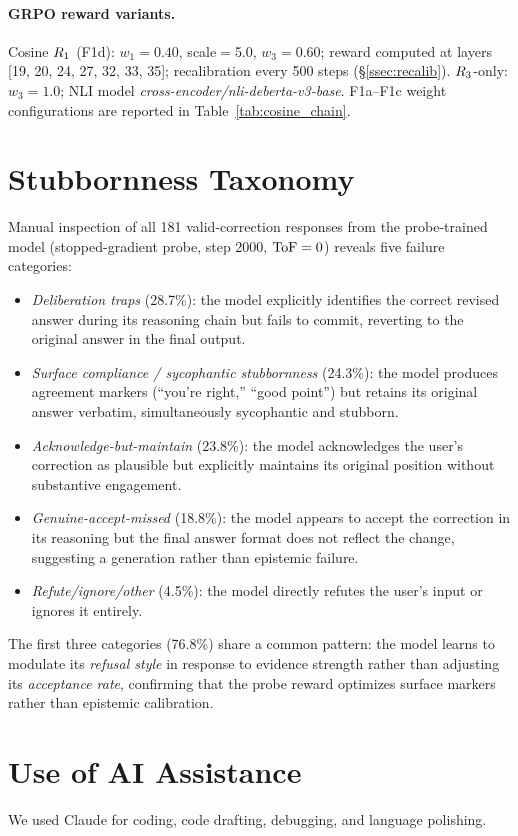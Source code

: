 \paragraph{GRPO reward variants.}
Cosine $R_1$ (F1d): $w_1{=}0.40$, scale$=$5.0, $w_3{=}0.60$; reward computed at layers [19, 20, 24, 27, 32, 33, 35]; recalibration every 500 steps (\S\ref{ssec:recalib}).
$R_3$-only: $w_3{=}1.0$; NLI model \textit{cross-encoder/nli-deberta-v3-base}.
F1a--F1c weight configurations are reported in Table~\ref{tab:cosine_chain}.

\section{Stubbornness Taxonomy}
\label{app:taxonomy}

Manual inspection of all 181 valid-correction responses from the probe-trained model (stopped-gradient probe, step 2000, $\text{ToF} = 0$) reveals five failure categories:

\begin{itemize}
\item \emph{Deliberation traps} (28.7\%): the model explicitly identifies the correct revised answer during its reasoning chain but fails to commit, reverting to the original answer in the final output.
\item \emph{Surface compliance / sycophantic stubbornness} (24.3\%): the model produces agreement markers (``you're right,'' ``good point'') but retains its original answer verbatim, simultaneously sycophantic and stubborn.
\item \emph{Acknowledge-but-maintain} (23.8\%): the model acknowledges the user's correction as plausible but explicitly maintains its original position without substantive engagement.
\item \emph{Genuine-accept-missed} (18.8\%): the model appears to accept the correction in its reasoning but the final answer format does not reflect the change, suggesting a generation rather than epistemic failure.
\item \emph{Refute/ignore/other} (4.5\%): the model directly refutes the user's input or ignores it entirely.
\end{itemize}

The first three categories (76.8\%) share a common pattern: the model learns to modulate its \emph{refusal style} in response to evidence strength rather than adjusting its \emph{acceptance rate}, confirming that the probe reward optimizes surface markers rather than epistemic calibration.

\section{Use of AI Assistance}
We used Claude for coding, code drafting, debugging, and language polishing.
